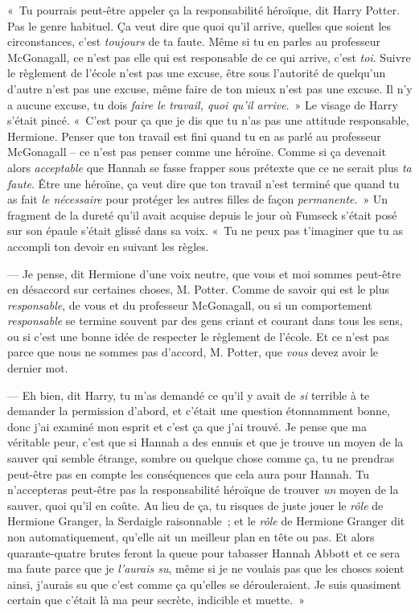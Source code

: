 «~Tu pourrais peut-être appeler ça la responsabilité héroïque, dit Harry Potter.
Pas le genre habituel.
Ça veut dire que quoi qu'il arrive, quelles que soient les circonstances, c'est \emph{toujours} de ta faute.
Même si tu en parles au professeur McGonagall, ce n'est pas elle qui est responsable de ce qui arrive, c'est \emph{toi}.
Suivre le règlement de l'école n'est pas une excuse, être sous l'autorité de quelqu'un d'autre n'est pas une excuse, même faire de ton mieux n'est pas une excuse.
Il n'y a aucune excuse, tu dois \emph{faire le travail, quoi qu'il arrive}.~»
Le visage de Harry s'était pincé.
«~C'est pour ça que je dis que tu n'as pas une attitude responsable, Hermione.
Penser que ton travail est fini quand tu en as parlé au professeur McGonagall -- ce n'est pas penser comme une héroïne.
Comme si ça devenait alors \emph{acceptable} que Hannah se fasse frapper sous prétexte que ce ne serait plus \emph{ta faute}.
Être une héroïne, ça veut dire que ton travail n'est terminé que quand tu as fait \emph{le nécessaire} pour protéger les autres filles de façon \emph{permanente}.~»
Un fragment de la dureté qu'il avait acquise depuis le jour où Fumseck s'était posé sur son épaule s'était glissé dans sa voix.
«~Tu ne peux pas t'imaginer que tu as accompli ton devoir en suivant les règles.

--- Je pense, dit Hermione d'une voix neutre, que vous et moi sommes peut-être en désaccord sur certaines choses, M. Potter.
Comme de savoir qui est le plus \emph{responsable}, de vous et du professeur McGonagall, ou si un comportement \emph{responsable} se termine souvent par des gens criant et courant dans tous les sens, ou si c'est une bonne idée de respecter le règlement de l'école.
Et ce n'est pas parce que nous ne sommes pas d'accord, M. Potter, que \emph{vous} devez avoir le dernier mot.

--- Eh bien, dit Harry, tu m'as demandé ce qu'il y avait de \emph{si} terrible à te demander la permission d'abord, et c'était une question étonnamment bonne, donc j'ai examiné mon esprit et c'est ça que j'ai trouvé.
Je pense que ma véritable peur, c'est que si Hannah a des ennuis et que je trouve un moyen de la sauver qui semble étrange, sombre ou quelque chose comme ça, tu ne prendras peut-être pas en compte les conséquences que cela aura pour Hannah.
Tu n'accepteras peut-être pas la responsabilité héroïque de trouver \emph{un} moyen de la sauver, quoi qu'il en coûte.
Au lieu de ça, tu risques de juste jouer le \emph{rôle} de Hermione Granger, la Serdaigle raisonnable~; et le \emph{rôle} de Hermione Granger dit non automatiquement, qu'elle ait un meilleur plan en tête ou pas.
Et alors quarante-quatre brutes feront la queue pour tabasser Hannah Abbott et ce sera ma faute parce que je \emph{l'aurais su}, même si je ne voulais pas que les choses soient ainsi, j'aurais su que c'est comme ça qu'elles se dérouleraient.
Je suis quasiment certain que c'était là ma peur secrète, indicible et muette.~»

